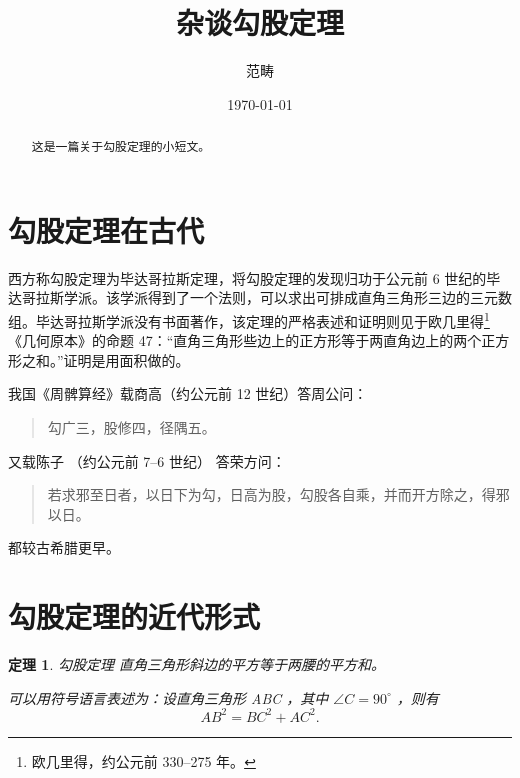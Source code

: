 \documentclass[UTF8]{ctexart}
\title{杂谈勾股定理}
\author{范畴}
\date{\today}
\begin{document}
\maketitle
\begin{abstract}
这是一篇关于勾股定理的小短文。
\end{abstract}

\tableofcontents
\section{勾股定理在古代}

西方称勾股定理为毕达哥拉斯定理，将勾股定理的发现归功于公元前 6 世纪的毕达哥拉斯学派。该学派得到了一个法则，可以求出可排成直角三角形三边的三元数组。毕达哥拉斯学派没有书面著作，该定理的严格表述和证明则见于欧几里得\footnote{欧几里得，约公元前 330--275 年。}《几何原本》的命题 47：“直角三角形些边上的正方形等于两直角边上的两个正方形之和。”证明是用面积做的。

我国《周髀算经》载商高（约公元前 12 世纪）答周公问：
\begin{quote}
\kaishu
勾广三，股修四，径隅五。
\end{quote}
又载陈子 （约公元前 7--6 世纪） 答荣方问：
\begin{quote}
\kaishu
若求邪至日者，以日下为勾，日高为股，勾股各自乘，并而开方除之，得邪以日。
\end{quote}
都较古希腊更早。



\section{勾股定理的近代形式}
\newtheorem{thm}{定理}
\begin{thm}{勾股定理}
直角三角形斜边的平方等于两腰的平方和。

可以用符号语言表述为：设直角三角形 ABC ，其中 $\angle C = 90^\circ$ ，则有
\begin{equation}
AB^2 = BC ^2 + AC^2.
\end{equation}
\end{thm}


\end{document}
